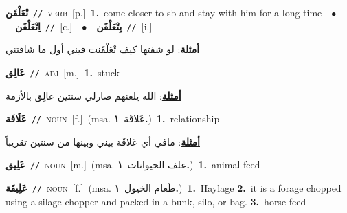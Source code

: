 \documentclass[10pt,a4paper,twoside]{article} %
\begin{document}
\begin{multicols}{2}
{\setlength\topsep{0pt}\textbf{\foreignlanguage{arabic}{تْعَلْقَن}}\ {\color{gray}\texttt{//}\color{black}}\ \textsc{verb}\ [p.]\ \textbf{1.}~come closer to sb and stay with him for a long time\ \ $\bullet$\ \ \setlength\topsep{0pt}\textbf{\foreignlanguage{arabic}{اِتْعَلْقَن}}\ {\color{gray}\texttt{//}\color{black}}\ [c.]\ \ $\bullet$\ \ \setlength\topsep{0pt}\textbf{\foreignlanguage{arabic}{يِتْعَلْقَن}}\ {\color{gray}\texttt{//}\color{black}}\ [i.]\  \begin{flushright}\color{gray}\foreignlanguage{arabic}{\textbf{\underline{\foreignlanguage{arabic}{أمثلة}}}: لو شفتها كيف تْعَلْقَنت فيني أول ما شافتني}\end{flushright}\color{black}} \vspace{2mm}

{\setlength\topsep{0pt}\textbf{\foreignlanguage{arabic}{عَالِق}}\ {\color{gray}\texttt{//}\color{black}}\ \textsc{adj}\ [m.]\ \textbf{1.}~stuck\  \begin{flushright}\color{gray}\foreignlanguage{arabic}{\textbf{\underline{\foreignlanguage{arabic}{أمثلة}}}: الله يلعنهم صارلي سنتين عالِق بالأزمة}\end{flushright}\color{black}} \vspace{2mm}

{\setlength\topsep{0pt}\textbf{\foreignlanguage{arabic}{عَلَاقَة}}\ {\color{gray}\texttt{//}\color{black}}\ \textsc{noun}\ [f.]\ \color{gray}(msa. \foreignlanguage{arabic}{عَلاقَة}~\foreignlanguage{arabic}{\textbf{١.}})\color{black}\ \textbf{1.}~relationship\  \begin{flushright}\color{gray}\foreignlanguage{arabic}{\textbf{\underline{\foreignlanguage{arabic}{أمثلة}}}: مافي أي عَلاقَة بيني وبينها من سنتين تقريباً}\end{flushright}\color{black}} \vspace{2mm}

{\setlength\topsep{0pt}\textbf{\foreignlanguage{arabic}{عَلِيق}}\ {\color{gray}\texttt{//}\color{black}}\ \textsc{noun}\ [m.]\ \color{gray}(msa. \foreignlanguage{arabic}{علف الحيوانات}~\foreignlanguage{arabic}{\textbf{١.}})\color{black}\ \textbf{1.}~animal feed\ } \vspace{2mm}

{\setlength\topsep{0pt}\textbf{\foreignlanguage{arabic}{عَلِيقَة}}\ {\color{gray}\texttt{//}\color{black}}\ \textsc{noun}\ [f.]\ \color{gray}(msa. \foreignlanguage{arabic}{طَعام الخيول}~\foreignlanguage{arabic}{\textbf{١.}})\color{black}\ \textbf{1.}~Haylage  \textbf{2.}~it is a forage chopped using a silage chopper and packed in a bunk, silo, or bag.  \textbf{3.}~horse feed\ } \vspace{2mm}


\end{multicols}
\end{document}
